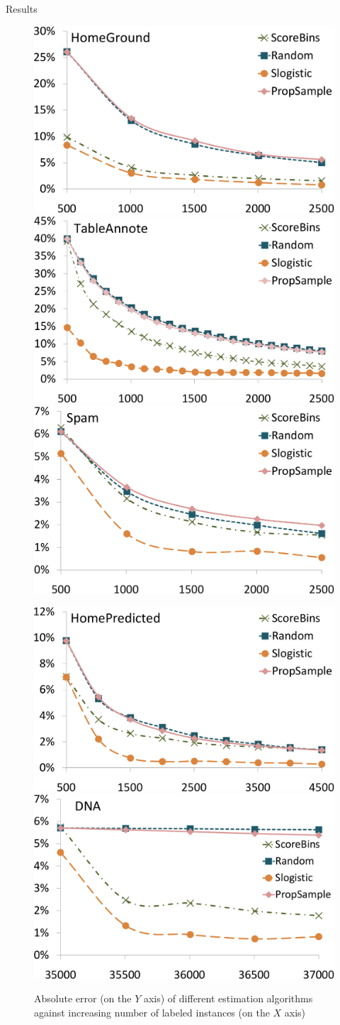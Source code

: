 \documentclass[11pt]{beamer}
\begin{document}
\begin{frame}[allowframebreaks]{Results}
\begin{center}
\begin{figure}[h]
\includegraphics[width=0.36\hsize]{figs/e1homeground_crop}
\includegraphics[width=0.36\hsize]{figs/e1tableannote_crop}
\includegraphics[width=0.36\hsize]{figs/e1spam_crop}
\end{figure}
\begin{figure}
\includegraphics[width=0.37\hsize]{figs/e1homepredicted_crop}
\includegraphics[width=0.37\hsize]{figs/e1dna_crop}
\caption{Absolute error (on the $Y$ axis) of different estimation algorithms against increasing number of labeled instances (on the $X$ axis)}
\label{fig:overall}
\end{figure}
\end{center}

\framebreak


\end{frame}
\end{document}
